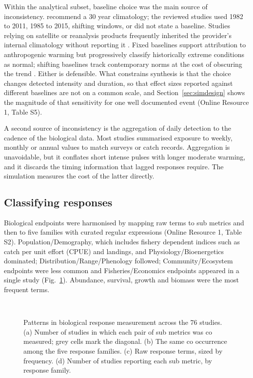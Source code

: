 \exposureTable

Within the analytical subset, baseline choice was the main source of inconsistency. \citet{hobday2016} recommend a 30 year climatology; the reviewed studies used 1982 to 2011, 1985 to 2015, shifting windows, or did not state a baseline. Studies relying on satellite or reanalysis products frequently inherited the provider's internal climatology without reporting it \citep[e.g.][]{abookire2022,brown2021}. Fixed baselines support attribution to anthropogenic warming but progressively classify historically extreme conditions as normal; shifting baselines track contemporary norms at the cost of obscuring the trend \citep{smith2025}. Either is defensible. What constrains synthesis is that the choice changes detected intensity and duration, so that effect sizes reported against different baselines are not on a common scale, and Section~\ref{sec:simdesign} shows the magnitude of that sensitivity for one well documented event (Online Resource 1, Table S5).

A second source of inconsistency is the aggregation of daily detection to the cadence of the biological data. Most studies summarised exposure to weekly, monthly or annual values to match surveys or catch records. Aggregation is unavoidable, but it conflates short intense pulses with longer moderate warming, and it discards the timing information that lagged responses require. The simulation measures the cost of the latter directly.

\subsection{Classifying responses}\label{sec:responses}

Biological endpoints were harmonised by mapping raw terms to sub metrics and then to five families with curated regular expressions (Online Resource 1, Table S2). Population\slash Demography, which includes fishery dependent indices such as catch per unit effort (CPUE) and landings, and Physiology\slash Bioenergetics dominated; Distribution\slash Range\slash Phenology followed; Community\slash Ecosystem endpoints were less common and Fisheries\slash Economics endpoints appeared in a single study (Fig.~\ref{fig:responses}). Abundance, survival, growth and biomass were the most frequent terms.

\begin{figure}[H]\centering
{}\hfill{}\\[8pt]
\hfill{}
\caption{Patterns in biological response measurement across the 76 studies. (a) Number of studies in which each pair of sub metrics was co measured; grey cells mark the diagonal. (b) The same co occurrence among the five response families. (c) Raw response terms, sized by frequency. (d) Number of studies reporting each sub metric, by response family.}
\label{fig:responses}
\end{figure}

